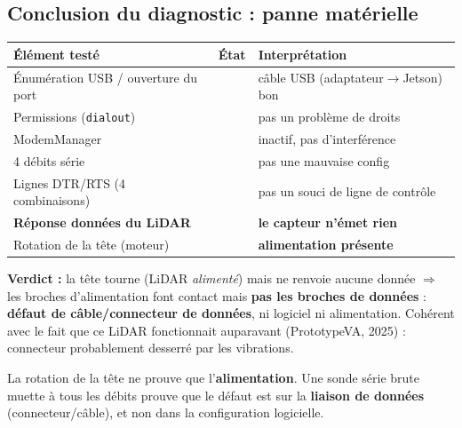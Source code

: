 \documentclass[a4paper,11pt]{article}
\newcommand{\ok}{\textcolor{success}{\checkmark}}
\newcommand{\ko}{\textcolor{danger}{\ding{55}}}
\begin{document}
\subsection{Conclusion du diagnostic : panne matérielle}
\begin{table}[H]
\centering
\begin{tabularx}{\textwidth}{@{}l c X@{}}
\toprule
Élément testé & État & Interprétation \\
\midrule
Énumération USB / ouverture du port & \ok & câble USB (adaptateur$\to$Jetson) bon \\
Permissions (\texttt{dialout})       & \ok & pas un problème de droits \\
ModemManager                         & \ok & inactif, pas d'interférence \\
4 débits série                       & \ok & pas une mauvaise config \\
Lignes DTR/RTS (4 combinaisons)      & \ok & pas un souci de ligne de contrôle \\
\textbf{Réponse données du LiDAR}    & \ko & \textbf{le capteur n'émet rien} \\
Rotation de la tête (moteur)         & \ok & \textbf{alimentation présente} \\
\bottomrule
\end{tabularx}
\end{table}
\noindent \textbf{Verdict :} la tête tourne (LiDAR \emph{alimenté}) mais ne renvoie
aucune donnée $\Rightarrow$ les broches d'alimentation font contact mais
\textbf{pas les broches de données} : \textbf{défaut de câble/connecteur de
données}, ni logiciel ni alimentation. Cohérent avec le fait que ce LiDAR
fonctionnait auparavant (PrototypeVA, 2025) : connecteur probablement desserré par
les vibrations.

\begin{tcolorbox}[colback=lightgreen,colframe=success,title=Leçon clé]
La rotation de la tête ne prouve que l'\textbf{alimentation}. Une sonde série
brute muette à tous les débits prouve que le défaut est sur la \textbf{liaison de
données} (connecteur/câble), et non dans la configuration logicielle.
\end{tcolorbox}
\end{document}
